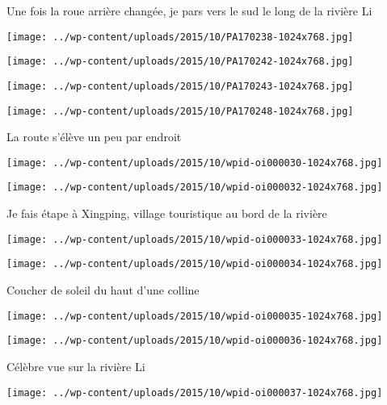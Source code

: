 Une fois la roue arrière changée, je pars vers le sud le long de la rivière Li \newline
 \newline
\centerline{\texttt{[image: ../wp-content/uploads/2015/10/PA170238-1024x768.jpg]} } 
 \newline
 \newline
\centerline{\texttt{[image: ../wp-content/uploads/2015/10/PA170242-1024x768.jpg]} } 
 \newline
 \newline
\centerline{\texttt{[image: ../wp-content/uploads/2015/10/PA170243-1024x768.jpg]} } 
 \newline
 \newline
\centerline{\texttt{[image: ../wp-content/uploads/2015/10/PA170248-1024x768.jpg]} } 
 \newline
 La route s'élève un peu par endroit \newline
 \newline
\centerline{\texttt{[image: ../wp-content/uploads/2015/10/wpid-oi000030-1024x768.jpg]} } 
 \newline
 \newline
\centerline{\texttt{[image: ../wp-content/uploads/2015/10/wpid-oi000032-1024x768.jpg]} } 
 \newline
 Je fais étape à Xingping, village touristique au bord de la rivière \newline
 \newline
\centerline{\texttt{[image: ../wp-content/uploads/2015/10/wpid-oi000033-1024x768.jpg]} } 
 \newline
 \newline
\centerline{\texttt{[image: ../wp-content/uploads/2015/10/wpid-oi000034-1024x768.jpg]} } 
 \newline
 Coucher de soleil du haut d'une colline \newline
 \newline
\centerline{\texttt{[image: ../wp-content/uploads/2015/10/wpid-oi000035-1024x768.jpg]} } 
 \newline
 \newline
\centerline{\texttt{[image: ../wp-content/uploads/2015/10/wpid-oi000036-1024x768.jpg]} } 
 \newline
 Célèbre vue sur la rivière Li \newline
 \newline
\centerline{\texttt{[image: ../wp-content/uploads/2015/10/wpid-oi000037-1024x768.jpg]} } 
